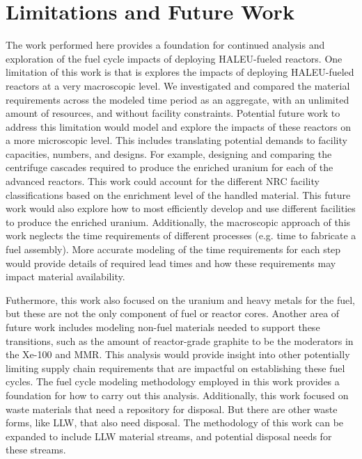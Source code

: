 \section{Limitations and Future Work}
The work performed here provides a foundation for continued analysis and 
exploration of the fuel cycle impacts of deploying \gls{HALEU}-fueled reactors. 
One limitation of this work is that is explores the impacts of 
deploying \gls{HALEU}-fueled reactors at a very macroscopic level. 
We investigated and compared the material requirements across the 
modeled time period as an aggregate, with an unlimited amount 
of resources, and without facility constraints.
Potential future work to address this limitation would model and 
explore the impacts of these reactors on a more microscopic level. 
This includes translating potential demands to facility capacities, 
numbers, and designs. For example, designing and comparing the 
centrifuge cascades required to produce the enriched uranium for 
each of the advanced reactors. This work could account for the 
different \gls{NRC} facility classifications based on the 
enrichment level of the handled material. This future work 
would also explore how to 
most efficiently develop and use different facilities to produce the 
enriched uranium. Additionally,
the macroscopic approach of this work neglects the 
time requirements 
of different processes (e.g. time to fabricate a fuel assembly). 
More accurate modeling of the time requirements for each step would 
provide details of required lead times and how these requirements 
may impact material availability. 

Futhermore, this work also focused on the uranium and heavy metals for 
the fuel, but these are not the only component of fuel or reactor 
cores. Another area of future work includes modeling non-fuel 
materials needed to support these transitions, such as the amount 
of reactor-grade graphite 
to be the moderators in the Xe-100 and \gls{MMR}. This analysis would 
provide insight into other potentially limiting supply chain 
requirements that are  
impactful on establishing these fuel cycles. The fuel cycle modeling 
methodology employed in this work provides a foundation 
for how to carry out this analysis. Additionally, this work 
focused on waste materials that need a repository for disposal. 
But there are other waste forms, like \acrfull{LLW}, that also need 
disposal. The methodology of this work can be expanded to 
include \gls{LLW} material streams, and potential disposal 
needs for these streams. 

